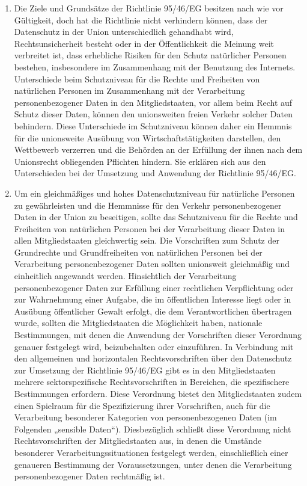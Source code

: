 \begin{enumerate}

   \item Die Ziele und Grundsätze der Richtlinie 95/46/EG besitzen nach wie vor Gültigkeit, doch hat die Richtlinie
    nicht verhindern können, dass der Datenschutz in der Union unterschiedlich gehandhabt wird, Rechtsunsicherheit
    besteht oder in der Öffentlichkeit die Meinung weit verbreitet ist, dass erhebliche Risiken für den Schutz
    natürlicher Personen bestehen, insbesondere im Zusammenhang mit der Benutzung des Internets. Unterschiede beim
    Schutzniveau für die Rechte und Freiheiten von natürlichen Personen im Zusammenhang mit der Verarbeitung
    personenbezogener Daten in den Mitgliedstaaten, vor allem beim Recht auf Schutz dieser Daten, können den
    unionsweiten freien Verkehr solcher Daten behindern. Diese Unterschiede im Schutzniveau können daher ein Hemmnis
    für die unionsweite Ausübung von Wirtschaftstätigkeiten darstellen, den Wettbewerb verzerren und die Behörden an
    der Erfüllung der ihnen nach dem Unionsrecht obliegenden Pflichten hindern. Sie erklären sich aus den Unterschieden
    bei der Umsetzung und Anwendung der Richtlinie 95/46/EG.%
   \label{eg:9}
   

   \item Um ein gleichmäßiges und hohes Datenschutzniveau für natürliche Personen zu gewährleisten und die Hemmnisse für
    den Verkehr personenbezogener Daten in der Union zu beseitigen, sollte das Schutzniveau für die Rechte und
    Freiheiten von natürlichen Personen bei der Verarbeitung dieser Daten in allen Mitgliedstaaten gleichwertig sein.
    Die Vorschriften zum Schutz der Grundrechte und Grundfreiheiten von natürlichen Personen bei der Verarbeitung
    personenbezogener Daten sollten unionsweit gleichmäßig und einheitlich angewandt werden. Hinsichtlich der
    Verarbeitung personenbezogener Daten zur Erfüllung einer rechtlichen Verpflichtung oder zur Wahrnehmung einer
    Aufgabe, die im öffentlichen Interesse liegt oder in Ausübung öffentlicher Gewalt erfolgt, die dem Verantwortlichen
    übertragen wurde, sollten die Mitgliedstaaten die Möglichkeit haben, nationale Bestimmungen, mit denen die
    Anwendung der Vorschriften dieser Verordnung genauer festgelegt wird, beizubehalten oder einzuführen. In Verbindung
    mit den allgemeinen und horizontalen Rechtsvorschriften über den Datenschutz zur Umsetzung der Richtlinie 95/46/EG
    gibt es in den Mitgliedstaaten mehrere sektorspezifische Rechtsvorschriften in Bereichen, die spezifischere
    Bestimmungen erfordern. Diese Verordnung bietet den Mitgliedstaaten zudem einen Spielraum für die Spezifizierung
    ihrer Vorschriften, auch für die Verarbeitung besonderer Kategorien von personenbezogenen Daten
    (im Folgenden „sensible Daten“). Diesbezüglich schließt diese Verordnung nicht Rechtsvorschriften der
    Mitgliedstaaten aus, in denen die Umstände besonderer Verarbeitungssituationen festgelegt werden, einschließlich
    einer genaueren Bestimmung der Voraussetzungen, unter denen die Verarbeitung personenbezogener Daten rechtmäßig
    ist.%
   \label{eg:10}
   

\end{enumerate}
